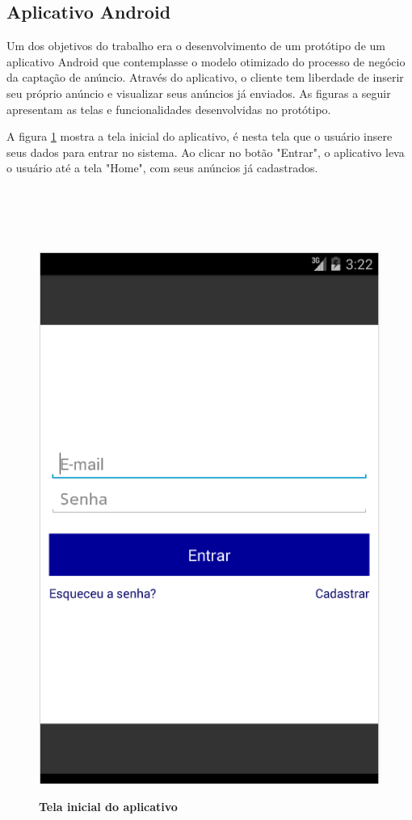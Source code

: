 \documentclass[
	12pt,				%
	openright,			%
	oneside,			%
	a4paper,			%
	chapter=TITLE,		%
	section=TITLE,		%
	english,			%
	french,				%
	spanish,			%
	brazil				%
	]{abntex2}
\begin{document}
\subsection{Aplicativo Android}

Um dos objetivos do trabalho era o desenvolvimento de um protótipo de um aplicativo Android que contemplasse o modelo otimizado do processo de negócio da captação de anúncio. Através do aplicativo, o cliente tem liberdade de inserir seu próprio anúncio e visualizar seus anúncios já enviados. As figuras a seguir apresentam as telas e funcionalidades desenvolvidas no protótipo.

A figura \ref{fig-android-login} mostra a tela inicial do aplicativo, é nesta tela que o usuário insere seus dados para entrar no sistema. Ao clicar no botão "Entrar", o aplicativo leva o usuário até a tela "Home", com seus anúncios já cadastrados. \\ \\ \\ \\ \\

\begin{figure}[h]
	\begin{center}
		\caption{
			\textbf{Tela inicial do aplicativo}
		}\label{fig-android-login}
		\includegraphics [scale=0.6]{imagens/android-login.png}
		\label{fig-android-login}
	\end{center}
\end{figure}
\end{document}
